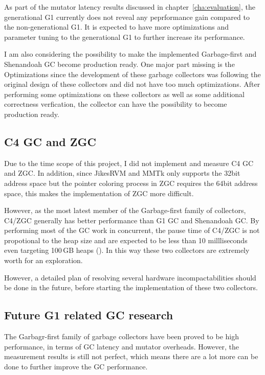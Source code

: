 As part of the mutator latency results discussed in chapter~\ref{cha:evaluation},
the generational G1 currently does not reveal any peprformance gain compared to
the non-generational G1. It is expected to have more optimizations and parameter
tuning to the generational G1 to further increase its performance.

I am also considering the possibility to make the implemented Garbage-first
and Shenandoah GC become production ready. One major part missing is the Optimizations
since the development of these garbage collectors was following the original design
of these collectors and did not have too much optimizations. After performing some
optimizations on these collectors as well as some additional correctness verfication,
the collector can have the possibility to become production ready.

\subsection{C4 GC and ZGC}

Due to the time scope of this project, I did not implement and measure C4 GC and ZGC.
In addition, since JikesRVM and MMTk only supports the 32bit address space but the pointer
coloring process in ZGC requires the 64bit address space, this makes the implementation
of ZGC more difficult.

However, as the most latest member of the Garbage-first family of collectors, C4/ZGC
generally has better performance than G1 GC and Shenandoah GC. By performing most of the
GC work in concurrent, the pause time of C4/ZGC is not propotional to the heap size and
are expected to be less than 10 millliseconds even targeting 100\,GB heaps (\cite{liden_karlsson_2018}).
In this way these two collectors are extremely worth for an exploration.

However, a detailed plan of resolving several hardware incompactabilities should be done in the future,
before starting the implementation of these two collectors.

\subsection{Future G1 related GC research}

The Garbagr-first family of garbage collectors have been proved to be high performance,
in terms of GC latency and mutator overheads. However, the measurement results is still
not perfect, which means there are a lot more can be done to further improve the
GC performance.

